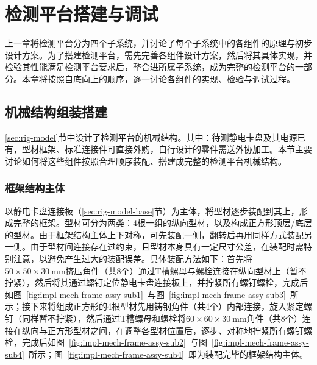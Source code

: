 \cleardoublepage
\chapter{检测平台搭建与调试}\label{ch:impl}

上一章将检测平台分为四个子系统，并讨论了每个子系统中的各组件的原理与初步设计方案。为了搭建检测平台，需先完善各组件设计方案，然后将其具体实现，并检验其性能满足检测平台要求后，整合进所属子系统，成为完整的检测平台的一部分。本章将按照自底向上的顺序，逐一讨论各组件的实现、检验与调试过程。



\section{机械结构组装搭建}\label{sec:impl-mech}

\ref{sec:rig-model}节中设计了检测平台的机械结构。其中：待测静电卡盘及其电源已有，型材框架、标准连接件可直接外购，自行设计的零件需送外协加工。本节主要讨论如何将这些组件按照合理顺序装配、搭建成完整的检测平台机械结构。


\subsection{框架结构主体}\label{sec:impl-mech-frame}

以静电卡盘连接板（\ref{sec:rig-model-base}节）为主体，将型材逐步装配到其上，形成完整的框架。型材可分为两类：4根一组的纵向型材，以及构成正方形顶层/底层的型材。由于框架结构主体上下对称，可先装配一侧，翻转后再用同样方式装配另一侧。由于型材间连接存在过约束，且型材本身具有一定尺寸公差，在装配时需特别注意，以避免产生过大的装配误差。具体装配方法如下：首先将$\num{50}\times\num{50}\times\SI{30}{\mm}$挤压角件（共8个）通过T槽螺母与螺栓连接在纵向型材上（暂不拧紧），然后将其通过螺钉定位静电卡盘连接板上，并拧紧所有螺钉螺栓，完成后如图~\ref{fig:impl-mech-frame-assy-sub1}~与图~\ref{fig:impl-mech-frame-assy-sub3}~所示；接下来将组成正方形的4根型材先用铸钢角件（共4个）内部连接，旋入紧定螺钉（同样暂不拧紧），然后通过T槽螺母和螺栓将$\num{60}\times\num{60}\times\SI{30}{\mm}$角件（共8个）连接在纵向与正方形型材之间，在调整各型材位置后，逐步、对称地拧紧所有螺钉螺栓，完成后如图~\ref{fig:impl-mech-frame-assy-sub2}~与图~\ref{fig:impl-mech-frame-assy-sub4}~所示；图~\ref{fig:impl-mech-frame-assy-sub4}~即为装配完毕的框架结构主体。

